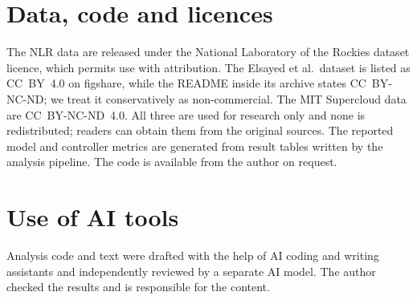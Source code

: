 \documentclass[11pt]{article}
\begin{document}
\section*{Data, code and licences}
The NLR data are released under the National Laboratory of the Rockies dataset licence, which permits
use with attribution. The Elsayed et al.\ dataset is listed as CC~BY~4.0 on figshare, while the README
inside its archive states CC~BY-NC-ND; we treat it conservatively as non-commercial. The MIT Supercloud
data are CC~BY-NC-ND~4.0. All three are used for research only and none is redistributed; readers can
obtain them from the original sources. The reported model and controller metrics are generated from result tables written by the analysis
pipeline. The code is available from the author on request.

\section*{Use of AI tools}
Analysis code and text were drafted with the help of AI coding and writing assistants and independently
reviewed by a separate AI model. The author checked the results and is responsible for the content.
\end{document}
